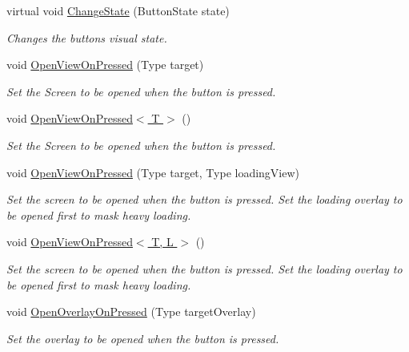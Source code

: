 \begin{DoxyCompactItemize}
\item 
virtual void \hyperlink{class_scaffolding_1_1_abstract_button_ae18ef32bad19d3fd5159bc825c9a1211}{Change\+State} (Button\+State state)
\begin{DoxyCompactList}\small\item\em Changes the buttons visual state. \end{DoxyCompactList}\item 
void \hyperlink{class_scaffolding_1_1_abstract_button_a8862a2385e9d955cf58a878828ddde05}{Open\+View\+On\+Pressed} (Type target)
\begin{DoxyCompactList}\small\item\em Set the Screen to be opened when the button is pressed. \end{DoxyCompactList}\item 
void \hyperlink{class_scaffolding_1_1_abstract_button_a2580b5e356bcda58ab8f7de52679c211}{Open\+View\+On\+Pressed$<$ T $>$} ()
\begin{DoxyCompactList}\small\item\em Set the Screen to be opened when the button is pressed. \end{DoxyCompactList}\item 
void \hyperlink{class_scaffolding_1_1_abstract_button_acba98947a8987ad65e7ce34114e903cf}{Open\+View\+On\+Pressed} (Type target, Type loading\+View)
\begin{DoxyCompactList}\small\item\em Set the screen to be opened when the button is pressed. Set the loading overlay to be opened first to mask heavy loading. \end{DoxyCompactList}\item 
void \hyperlink{class_scaffolding_1_1_abstract_button_adc646043693b169f9810a6c0bf662007}{Open\+View\+On\+Pressed$<$ T, L $>$} ()
\begin{DoxyCompactList}\small\item\em Set the screen to be opened when the button is pressed. Set the loading overlay to be opened first to mask heavy loading. \end{DoxyCompactList}\item 
void \hyperlink{class_scaffolding_1_1_abstract_button_a1087cf2c11995a65a0432bccdd930fd6}{Open\+Overlay\+On\+Pressed} (Type target\+Overlay)
\begin{DoxyCompactList}\small\item\em Set the overlay to be opened when the button is pressed. \end{DoxyCompactList}\item 

\end{DoxyCompactItemize}
